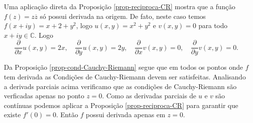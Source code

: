 \begin{exemplo}
Uma aplicação direta da Proposição \ref{prop-reciproca-CR} mostra que a função  
$f(z) =z\overline{z}$ só possui derivada na origem. De fato, neste caso temos 
$f(x+iy)= x+ 2+y^2$, logo $u(x,y)=x^2+y^2$ e $v(x,y)=0$ para todo $x+iy\in\mathbb{C}$. 
Logo
\[
\frac{\partial }{\partial x}u(x,y) = 2x,\quad 
\frac{\partial }{\partial y}u(x,y)= 2y,\quad 
\frac{\partial }{\partial x}v(x,y) = 0,\quad 
\frac{\partial }{\partial y}v(x,y) = 0.
\]

Da Proposição \ref{prop-cond-Cauchy-Riemann} segue que em todos os pontos onde $f$ 
tem derivada as Condições de Cauchy-Riemann devem ser satisfeitas. Analisando 
a derivads parciais acima verificamo que as condições de Cauchy-Riemann são verficadas apenas no ponto $z=0$.
Como  as derivadas parciais de $u$ e $v$ são contínuas podemos aplicar a  Proposição \ref{prop-reciproca-CR}
para garantir que existe $f'(0)=0$. Então $f$ possui derivada apenas em $z=0$.
\end{exemplo}



